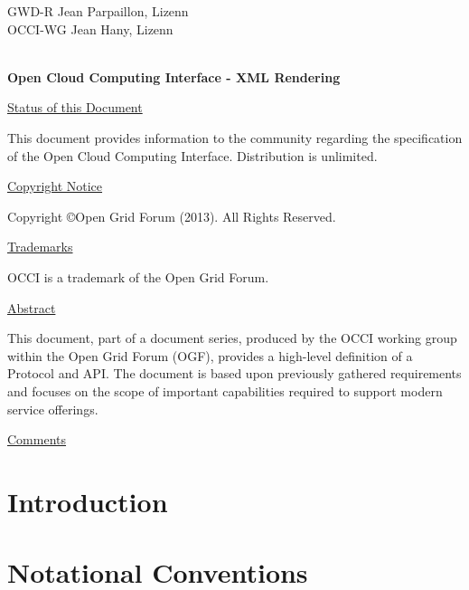 \documentclass[10pt,a4paper]{article}
\begin{document}
\thispagestyle{empty}

GWD-R \hfill Jean Parpaillon, Lizenn\\
OCCI-WG \hfill Jean Hany, Lizenn\\
\\

\vspace*{0.5in}

\begin{Large}
\textbf{Open Cloud Computing Interface - XML Rendering}
\end{Large}

\vspace*{0.5in}

\underline{Status of this Document}

This document provides information to the community regarding the
specification of the Open Cloud Computing Interface. Distribution is
unlimited.

\underline{Copyright Notice}

Copyright \copyright Open Grid Forum (2013). All Rights Reserved.

\underline{Trademarks}

OCCI is a trademark of the Open Grid Forum.

\underline{Abstract}

This document, part of a document series, produced by the OCCI working
group within the Open Grid Forum (OGF), provides a high-level
definition of a Protocol and API. The document is based upon
previously gathered requirements and focuses on the scope of important
capabilities required to support modern service offerings.

\underline{Comments}
\newcommand{\ralf}[1]{\textcolor{red}{RN: #1}}
\newcommand{\andy}[1]{\textcolor{green}{AE: #1}}
\newcommand{\florian}[1]{\textcolor{blue}{FF: #1}}
\newcommand{\jean}[1]{\textcolor{purple}{JP: #1}}

\newpage
\tableofcontents
\newpage

\section{Introduction}


\section{Notational Conventions}

\end{document}
